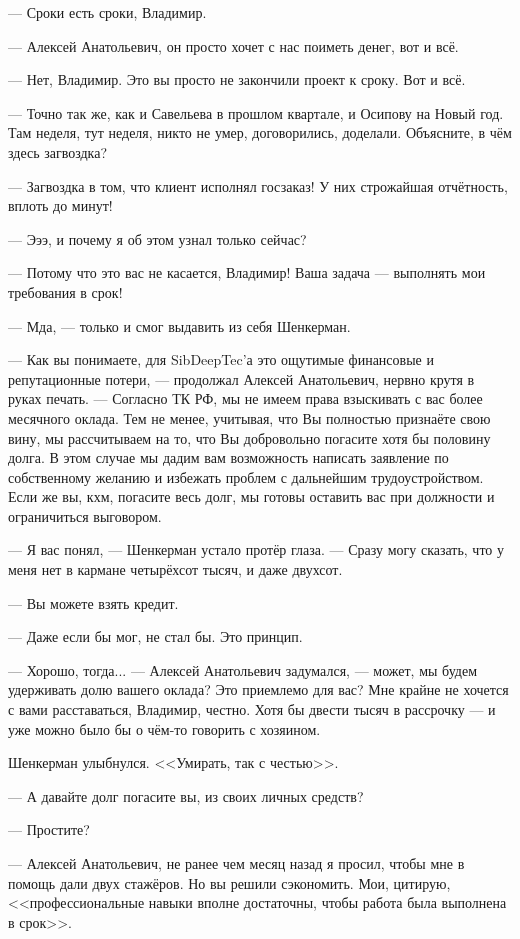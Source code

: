--- Сроки есть сроки, Владимир.

--- Алексей Анатольевич, он просто хочет с нас поиметь денег, вот и всё.

--- Нет, Владимир.
Это вы просто не закончили проект к сроку.
Вот и всё.

--- Точно так же, как и Савельева в прошлом квартале, и Осипову на Новый год.
Там неделя, тут неделя, никто не умер, договорились, доделали.
Объясните, в чём здесь загвоздка?

--- Загвоздка в том, что клиент исполнял госзаказ!
У них строжайшая отчётность, вплоть до минут!

--- Эээ, и почему я об этом узнал только сейчас?

--- Потому что это вас не касается, Владимир!
Ваша задача --- выполнять мои требования в срок!

--- Мда, --- только и смог выдавить из себя Шенкерман.

--- Как вы понимаете, для SibDeepTec'а это ощутимые финансовые и репутационные потери, --- продолжал Алексей Анатольевич, нервно крутя в руках печать.
--- Согласно ТК РФ, мы не имеем права взыскивать с вас более месячного оклада.
Тем не менее, учитывая, что Вы полностью признаёте свою вину, мы рассчитываем на то, что Вы добровольно погасите хотя бы половину долга.
В этом случае мы дадим вам возможность написать заявление по собственному желанию и избежать проблем с дальнейшим трудоустройством.
Если же вы, кхм, погасите весь долг, мы готовы оставить вас при должности и ограничиться выговором.

--- Я вас понял, --- Шенкерман устало протёр глаза.
--- Сразу могу сказать, что у меня нет в кармане четырёхсот тысяч, и даже двухсот.

--- Вы можете взять кредит.

--- Даже если бы мог, не стал бы.
Это принцип.

--- Хорошо, тогда... --- Алексей Анатольевич задумался, --- может, мы будем удерживать долю вашего оклада?
Это приемлемо для вас?
Мне крайне не хочется с вами расставаться, Владимир, честно.
Хотя бы двести тысяч в рассрочку --- и уже можно было бы о чём-то говорить с хозяином.

Шенкерман улыбнулся.
<<Умирать, так с честью>>.

--- А давайте долг погасите вы, из своих личных средств?

--- Простите?

--- Алексей Анатольевич, не ранее чем месяц назад я просил, чтобы мне в помощь дали двух стажёров.
Но вы решили сэкономить.
Мои, цитирую, <<профессиональные навыки вполне достаточны, чтобы работа была выполнена в срок>>.

